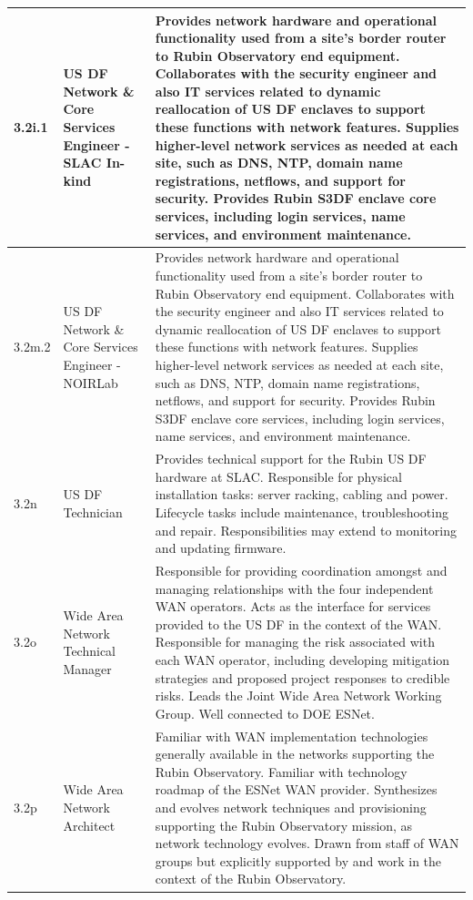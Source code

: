 \begin{longtable} {|p{}|p{}|p{}|}
{3.2i.1}&{US DF Network \& Core Services Engineer - SLAC In-kind}&{Provides network hardware and operational functionality used from a site's border router to Rubin Observatory end equipment. Collaborates with the security engineer and also IT services related to dynamic reallocation of US DF enclaves to support these functions with network features. Supplies higher-level network services as needed at each site, such as DNS, NTP, domain name registrations, netflows, and support for security. Provides Rubin S3DF enclave core services, including login services, name services, and environment maintenance.} \\ \hline
{3.2m.2}&{US DF Network \& Core Services Engineer - NOIRLab}&{Provides network hardware and operational functionality used from a site's border router to Rubin Observatory end equipment. Collaborates with the security engineer and also IT services related to dynamic reallocation of US DF enclaves to support these functions with network features. Supplies higher-level network services as needed at each site, such as DNS, NTP, domain name registrations, netflows, and support for security. Provides Rubin S3DF enclave core services, including login services, name services, and environment maintenance.} \\ \hline
{3.2n}&{US DF Technician}&{Provides technical support for the Rubin US DF hardware at SLAC. Responsible for physical installation tasks: server racking, cabling and power. Lifecycle tasks include maintenance, troubleshooting and repair. Responsibilities may extend to monitoring and updating firmware.} \\ \hline
{3.2o}&{Wide Area Network Technical Manager}&{Responsible for providing coordination amongst and managing relationships with the four independent WAN operators. Acts as the interface for services provided to the US DF in the context of the WAN. Responsible for managing the risk associated with each WAN operator, including developing mitigation strategies and proposed project responses to credible risks. Leads the Joint Wide Area Network Working Group. Well connected to DOE ESNet.} \\ \hline
{3.2p}&{Wide Area Network Architect}&{Familiar with WAN implementation technologies generally available in the networks supporting the Rubin Observatory. Familiar with technology roadmap of the ESNet WAN provider. Synthesizes and evolves network techniques and provisioning supporting the Rubin Observatory mission, as network technology evolves. Drawn from staff of WAN groups but explicitly supported by and work in the context of the Rubin Observatory.} \\ \hline

\end{longtable}
